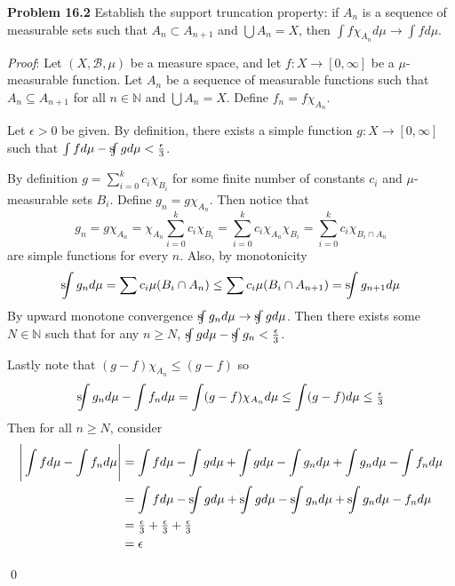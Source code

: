 \documentclass[12pt]{article}
\newcommand{\problem}[1]{\hspace{-4 ex} \large \textbf{Problem #1} }
\newcommand{\sint}{\text{s}\kern-5pt\int}
\renewenvironment{proof}{\hspace{-4 ex} \emph{Proof}:}{\qed}
\newcommand{\NN}{\mathbb{N}}
\newcommand{\BB}{\mathcal{B}}
\begin{document}
\bigbreak
\problem{16.2} Establish the support truncation property: if $A_n$ is a sequence of measurable sets such that $A_n\subset A_{n+1}$ and $\bigcup A_n=X$, then $\int f\chi_{A_n} d\mu\to\int f d\mu$.
\bigbreak

\begin{proof}
	Let $(X,\BB,\mu)$ be a measure space, and let $f:X \to [0,\infty]$ be a $\mu$-measurable function. Let $A_n$ be a sequence of measurable functions such that $A_n \subseteq A_{n+1}$ for all $n \in \NN$ and $\bigcup A_n = X$. Define $f_n = f\chi_{A_n}$. \bigbreak
	
	Let $\epsilon > 0$ be given. By definition, there exists a simple function $g:X \to [0,\infty]$ such that $\int f d\mu - \sint g d\mu < \tfrac{\epsilon}{3}$. \bigbreak
	
	By definition $g = \sum_{i=0}^k c_i \chi_{B_i}$ for some finite number of constants $c_i$ and $\mu$-measurable sets $B_i$. Define $g_n = g\chi_{A_n}$. Then notice that
	$$
	g_n = g\chi_{A_n} = \chi_{A_n} \sum_{i=0}^k c_i \chi_{B_i} =  \sum_{i=0}^k c_i \chi_{A_n} \chi_{B_i} = \sum_{i=0}^k c_i \chi_{B_i \cap A_n}
	$$
	are simple functions for every $n$. Also, by monotonicity
	$$
	\sint g_n d\mu = \sum c_i \mu(B_i \cap A_n) \leq \sum c_i \mu(B_i \cap A_{n+1}) = \sint g_{n+1} d\mu
	$$
	By upward monotone convergence $\sint g_n d\mu \to \sint g d\mu $. Then there exists some $N \in \NN$ such that for any $n \geq N$, $\sint g d\mu - \sint g_n < \tfrac{\epsilon}{3}$. \bigbreak
	
	Lastly note that $(g-f)\chi_{A_n} \leq (g-f)$ so 
	$$
	\sint g_n d\mu - \int f_n d\mu = \int(g-f)\chi_{A_n} d\mu \leq \int (g-f) d\mu \leq \tfrac{\epsilon}{3}
	$$
	Then for all $n \geq N$, consider
	\begin{align*}
		\Bigg \vert \int f d\mu - \int f_n d\mu \Bigg\vert 
		& = \int f d\mu - \int g d\mu + \int g d\mu - \int g_n d\mu + \int g_n d\mu - \int f_n d\mu \\
		& = \int f d\mu - \sint g d\mu + \sint g d\mu - \sint g_n d\mu + \sint g_n d\mu - f_n d\mu \\
		& = \tfrac{\epsilon}{3} + \tfrac{\epsilon}{3} + \tfrac{\epsilon}{3} \\
		& = \epsilon
	\end{align*}
	
\end{proof}
\end{document}
